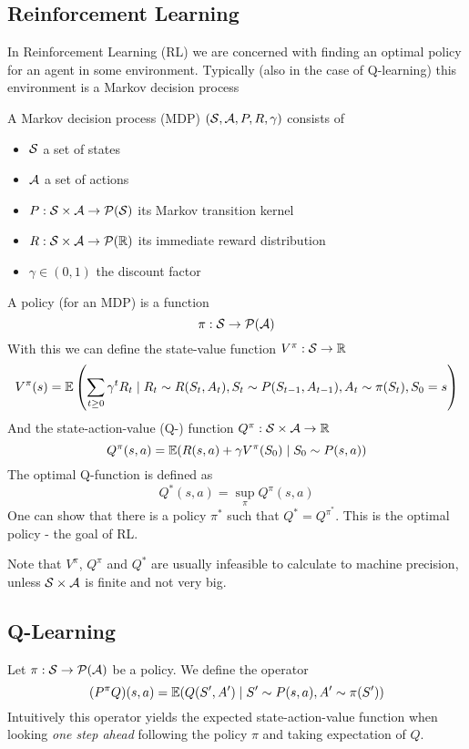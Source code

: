 \subsection{Reinforcement Learning}
In Reinforcement Learning (RL) we are concerned with finding an optimal policy
for an agent in some environment.
Typically (also in the case of Q-learning) this environment is a
Markov decision process

\begin{Definition}
	A Markov decision process (MDP) $(\mathcal{S}, \mathcal{A}, P, R, \gamma)$
	consists of
\begin{itemize}
\item $\mathcal{S}$ a set of states
\item $\mathcal{A}$ a set of actions
\item $P : \mathcal{S} \times \mathcal{A} \to \mathcal{P}(\mathcal{S})$ its Markov transition kernel
\item $R : \mathcal{S} \times \mathcal{A} \to \mathcal{P}(\mathbb{R})$ its immediate reward distribution
\item $\gamma \in (0,1)$ the discount factor
\end{itemize}
\end{Definition}

A policy (for an MDP) is a function
\[\pi : \mathcal{S} \to \mathcal{P}(\mathcal{A})\]
With this we can define the state-value function $V^\pi : \mathcal{S} \to \mathbb{R}$
\[ V^\pi(s) = \mathbb{E} \left( \sum_{t \geq 0} \gamma^t R_t \mid
R_t \sim R(S_t, A_t), S_t \sim P(S_{t-1}, A_{t-1}), A_t \sim \pi(S_t), S_0 = s
\right) \]
And the state-action-value (Q-) function $Q^\pi : \mathcal{S} \times \mathcal{A} \to \mathbb{R}$
\[ Q^\pi(s, a) = \mathbb{E} (R(s, a) + \gamma V^\pi(S_0) \mid S_0 \sim P(s, a)) \]
The optimal Q-function is defined as
\[ Q^*(s, a) = \sup_\pi Q^\pi(s, a) \]
One can show that there is a policy $\pi^*$ such that $Q^* = Q^{\pi^*}$.
This is the optimal policy - the goal of RL. 

Note that $V^\pi$, $Q^\pi$ and $Q^*$ are usually infeasible to calculate to
machine precision, unless $\mathcal{S} \times \mathcal{A}$ is finite and not very big.

\subsection{Q-Learning}

Let $\pi: \mathcal{S} \to \mathcal{P}(\mathcal{A})$ be a policy. We define the operator
\[ (P^\pi Q)(s, a) = \mathbb{E} (Q(S', A') \mid S' \sim P(s, a), A' \sim \pi(S')) \]
Intuitively this operator yields the expected state-action-value function
when looking \emph{one step ahead} following the policy $\pi$ and taking
expectation of $Q$.

